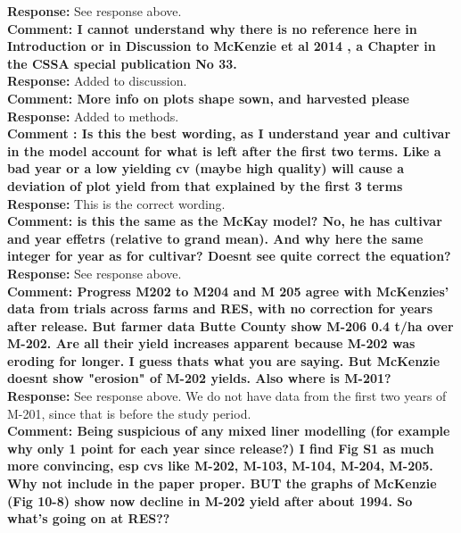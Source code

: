 \documentclass{article} \usepackage[margin=1in]{geometry}
\begin{document}
\textbf{Response: } See response above.\\

\textbf{Comment: I cannot understand why there is no reference here in
  Introduction or in Discussion to McKenzie et al 2014 , a Chapter in
  the CSSA special publication No 33.}\\

\textbf{Response: } Added to discussion.\\

\textbf{Comment: More info on plots shape sown, and harvested please}\\

\textbf{Response: } Added to methods.\\

\textbf{Comment : Is this the best wording, as I understand year and
  cultivar in the model account for what is left after the first two
  terms. Like a bad year or a low yielding cv (maybe high quality)
  will cause a deviation of plot yield from that explained by the
  first 3 terms}\\

\textbf{Response: } This is the correct wording.\\

\textbf{Comment: is this the same as the McKay model? No, he has
  cultivar and year effetrs (relative to grand mean). And why here the
  same integer for year as for cultivar? Doesnt see quite correct the
  equation?}\\

\textbf{Response: } See response above.\\

\textbf{Comment: Progress M202 to M204 and M 205 agree with McKenzies'
  data from trials across farms and RES, with no correction for years
  after release.  But farmer data Butte County show M-206 0.4 t/ha
  over M-202. Are all their yield increases apparent because M-202 was
  eroding for longer. I guess thats what you are saying. But McKenzie
  doesnt show "erosion" of M-202 yields. Also where is M-201?}\\

\textbf{Response: } See response above. We do not have data from the
first two years of M-201, since that is before the study period.\\

\textbf{Comment: Being suspicious of any mixed liner modelling (for
  example why only 1 point for each year since release?) I find Fig S1
  as much more convincing, esp cvs like M-202, M-103, M-104, M-204,
  M-205. Why not include in the paper proper.  BUT the graphs of
  McKenzie (Fig 10-8) show now decline in M-202 yield after about
  1994. So what's going on at RES??}\\
\end{document}
